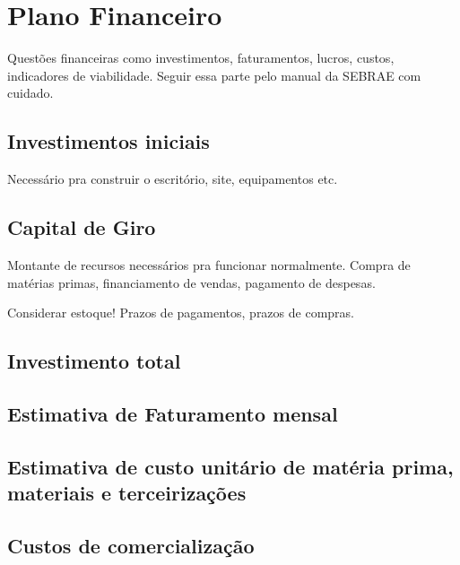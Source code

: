 \section{Plano Financeiro}

Questões financeiras como investimentos, faturamentos, lucros, custos, indicadores
de viabilidade. Seguir essa parte pelo manual da SEBRAE com cuidado.

\subsection{Investimentos iniciais}

Necessário pra construir o escritório, site, equipamentos etc.

\subsection{Capital de Giro}

Montante de recursos necessários pra funcionar normalmente. Compra de matérias primas,
financiamento de vendas, pagamento de despesas.

Considerar estoque!
Prazos de pagamentos, prazos de compras.

\subsection{Investimento total}

\subsection{Estimativa de Faturamento mensal}

\subsection{Estimativa de custo unitário de matéria prima, materiais e terceirizações}

\subsection{Custos de comercialização}